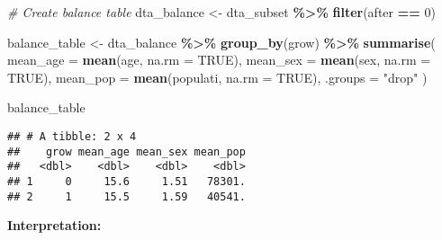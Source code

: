 \documentclass[
]{article}
\newenvironment{Shaded}{\begin{snugshade}}{\end{snugshade}}
\newcommand{\AttributeTok}[1]{\textcolor[rgb]{0.13,0.29,0.53}{#1}}
\newcommand{\CommentTok}[1]{\textcolor[rgb]{0.56,0.35,0.01}{\textit{#1}}}
\newcommand{\ConstantTok}[1]{\textcolor[rgb]{0.56,0.35,0.01}{#1}}
\newcommand{\DecValTok}[1]{\textcolor[rgb]{0.00,0.00,0.81}{#1}}
\newcommand{\FunctionTok}[1]{\textcolor[rgb]{0.13,0.29,0.53}{\textbf{#1}}}
\newcommand{\NormalTok}[1]{#1}
\newcommand{\OtherTok}[1]{\textcolor[rgb]{0.56,0.35,0.01}{#1}}
\newcommand{\SpecialCharTok}[1]{\textcolor[rgb]{0.81,0.36,0.00}{\textbf{#1}}}
\newcommand{\StringTok}[1]{\textcolor[rgb]{0.31,0.60,0.02}{#1}}
\begin{document}
\begin{Shaded}
\begin{Highlighting}[]
\CommentTok{\# Create balance table}
\NormalTok{dta\_balance }\OtherTok{\textless{}{-}}\NormalTok{ dta\_subset }\SpecialCharTok{\%\textgreater{}\%}
  \FunctionTok{filter}\NormalTok{(after }\SpecialCharTok{==} \DecValTok{0}\NormalTok{)}

\NormalTok{balance\_table }\OtherTok{\textless{}{-}}\NormalTok{ dta\_balance }\SpecialCharTok{\%\textgreater{}\%}
  \FunctionTok{group\_by}\NormalTok{(grow) }\SpecialCharTok{\%\textgreater{}\%}
  \FunctionTok{summarise}\NormalTok{(}
    \AttributeTok{mean\_age =} \FunctionTok{mean}\NormalTok{(age, }\AttributeTok{na.rm =} \ConstantTok{TRUE}\NormalTok{),}
    \AttributeTok{mean\_sex =} \FunctionTok{mean}\NormalTok{(sex, }\AttributeTok{na.rm =} \ConstantTok{TRUE}\NormalTok{),}
    \AttributeTok{mean\_pop =} \FunctionTok{mean}\NormalTok{(populati, }\AttributeTok{na.rm =} \ConstantTok{TRUE}\NormalTok{),}
    \AttributeTok{.groups =} \StringTok{"drop"}
\NormalTok{  )}

\NormalTok{balance\_table}
\end{Highlighting}
\end{Shaded}

\begin{verbatim}
## # A tibble: 2 x 4
##    grow mean_age mean_sex mean_pop
##   <dbl>    <dbl>    <dbl>    <dbl>
## 1     0     15.6     1.51   78301.
## 2     1     15.5     1.59   40541.
\end{verbatim}

\textbf{Interpretation:}
\end{document}
